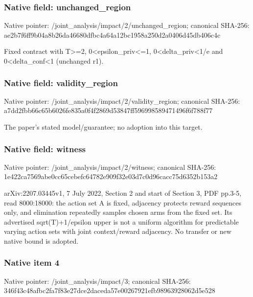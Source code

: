 \documentclass[10pt,a4paper]{article}
\begin{document}
\subsubsection{Native field: unchanged\_\allowbreak{}region}
Native pointer: /joint\_\allowbreak{}analysis/impact/2/unchanged\_\allowbreak{}region; canonical SHA-256: ae2b7f6ff9b04a8b26da46680dfbc4a64a12bc1958a250d2a0406d45db406c4c

\begingroup\raggedright\sloppy Fixed contract with T>=\allowbreak{}2,\allowbreak{} 0<epsilon\_\allowbreak{}priv<=\allowbreak{}1,\allowbreak{} 0<delta\_\allowbreak{}priv<1/\allowbreak{}e and 0<delta\_\allowbreak{}conf<1 (unchanged r1).\par\endgroup

\subsubsection{Native field: validity\_\allowbreak{}region}
Native pointer: /joint\_\allowbreak{}analysis/impact/2/validity\_\allowbreak{}region; canonical SHA-256: a7dd2fbb66c65b6026fe835a0f4f2869d53847ff596998589471496f6f788f77

\begingroup\raggedright\sloppy The paper's stated model/\allowbreak{}guarantee;\allowbreak{} no adoption into this target.\par\endgroup

\subsubsection{Native field: witness}
Native pointer: /joint\_\allowbreak{}analysis/impact/2/witness; canonical SHA-256: 1e422ca7569abe0cc65cebefc64782e909f32e03d7c0d96cacc75d6352b153a2

\begingroup\raggedright\sloppy arXiv:\allowbreak{}2207.03445v1,\allowbreak{} 7 July 2022,\allowbreak{} Section 2 and start of Section 3,\allowbreak{} PDF pp.3-5,\allowbreak{} read 8000:\allowbreak{}18000:\allowbreak{} the action set A is fixed,\allowbreak{} adjacency protects reward sequences only,\allowbreak{} and elimination repeatedly samples chosen arms from the fixed set. Its advertised sqrt(T)+1/\allowbreak{}epsilon upper is not a uniform algorithm for predictable varying action sets with joint context/\allowbreak{}reward adjacency. No transfer or new native bound is adopted.\par\endgroup

\subsubsection{Native item 4}
Native pointer: /joint\_\allowbreak{}analysis/impact/3; canonical SHA-256: 346f43c48afbc2fa7f83e27dce2daceda57e00267921efb98963928062d5e528
\end{document}
